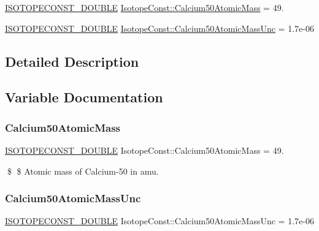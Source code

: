 \begin{DoxyCompactItemize}
\item 
\mbox{\hyperlink{group___isotope_const-_macros_ga8f45a7272ce02c0b4c65c44636ed719a}{I\+S\+O\+T\+O\+P\+E\+C\+O\+N\+S\+T\+\_\+\+D\+O\+U\+B\+LE}} \mbox{\hyperlink{group___isotope_const-_calcium-_ca50_ga88d7878c3248e08116add69d5c4eef0f}{Isotope\+Const\+::\+Calcium50\+Atomic\+Mass}} = 49.
\item 
\mbox{\hyperlink{group___isotope_const-_macros_ga8f45a7272ce02c0b4c65c44636ed719a}{I\+S\+O\+T\+O\+P\+E\+C\+O\+N\+S\+T\+\_\+\+D\+O\+U\+B\+LE}} \mbox{\hyperlink{group___isotope_const-_calcium-_ca50_ga3da3f174cf7f9bc604c37ab40d920fe5}{Isotope\+Const\+::\+Calcium50\+Atomic\+Mass\+Unc}} = 1.\+7e-\/06
\end{DoxyCompactItemize}


\subsection{Detailed Description}


\subsection{Variable Documentation}
\mbox{\label{group___isotope_const-_calcium-_ca50_ga88d7878c3248e08116add69d5c4eef0f}} 
\subsubsection{\texorpdfstring{Calcium50\+Atomic\+Mass}{Calcium50AtomicMass}}
{\footnotesize\ttfamily \mbox{\hyperlink{group___isotope_const-_macros_ga8f45a7272ce02c0b4c65c44636ed719a}{I\+S\+O\+T\+O\+P\+E\+C\+O\+N\+S\+T\+\_\+\+D\+O\+U\+B\+LE}} Isotope\+Const\+::\+Calcium50\+Atomic\+Mass = 49.}

\$ \$ Atomic mass of Calcium-\/50 in amu. \mbox{\label{group___isotope_const-_calcium-_ca50_ga3da3f174cf7f9bc604c37ab40d920fe5}} 
\subsubsection{\texorpdfstring{Calcium50\+Atomic\+Mass\+Unc}{Calcium50AtomicMassUnc}}
{\footnotesize\ttfamily \mbox{\hyperlink{group___isotope_const-_macros_ga8f45a7272ce02c0b4c65c44636ed719a}{I\+S\+O\+T\+O\+P\+E\+C\+O\+N\+S\+T\+\_\+\+D\+O\+U\+B\+LE}} Isotope\+Const\+::\+Calcium50\+Atomic\+Mass\+Unc = 1.\+7e-\/06}

